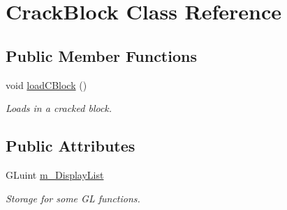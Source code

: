 \hypertarget{classCrackBlock}{\section{Crack\-Block Class Reference}
\label{classCrackBlock}
}
\subsection*{Public Member Functions}
\begin{DoxyCompactItemize}
\item 
\hypertarget{classCrackBlock_adcd41e1b1206f519577a65f41f5b1fee}{void \hyperlink{classCrackBlock_adcd41e1b1206f519577a65f41f5b1fee}{load\-C\-Block} ()}\label{classCrackBlock_adcd41e1b1206f519577a65f41f5b1fee}

\begin{DoxyCompactList}\small\item\em Loads in a cracked block. \end{DoxyCompactList}\end{DoxyCompactItemize}
\subsection*{Public Attributes}
\begin{DoxyCompactItemize}
\item 
\hypertarget{classCrackBlock_abcbd09c89bb63bc697bbe456efff796c}{G\-Luint \hyperlink{classCrackBlock_abcbd09c89bb63bc697bbe456efff796c}{m\-\_\-\-Display\-List}}\label{classCrackBlock_abcbd09c89bb63bc697bbe456efff796c}

\begin{DoxyCompactList}\small\item\em Storage for some G\-L functions. \end{DoxyCompactList}\end{DoxyCompactItemize}
